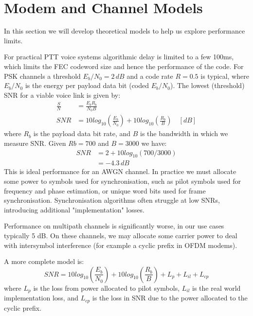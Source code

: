 \documentclass{article}
\begin{document}

\clearpage

\section{Modem and Channel Models}

In this section we will develop theoretical models to help us explore performance limits.

For practical PTT voice systems algorithmic delay is limited to a few 100ms, which limits the FEC codeword size and hence the performance of the code.  For PSK channels a threshold $E_b/N_0=2 \, \si{dB}$ and a code rate $R=0.5$ is typical, where $E_b/N_0$ is the energy per payload data bit (coded $E_b/N_0$).  The lowest (threshold) SNR for a viable voice link is given by:
\begin{equation}
\label{eq:snr}
\begin{split}
\frac{S}{N} &= \frac{E_bR_b}{N_0B} \\
SNR &= 10log_{10}\left(\frac{E_b}{N_0}\right) + 10log_{10}\left(\frac{R_b}{B}\right) \quad [\si{dB}]
\end{split}
\end{equation}
where $R_b$ is the payload data bit rate, and $B$ is the bandwidth in which we measure SNR.  Given $Rb=700$ and $B=3000$ we have:
\begin{equation}
\begin{split}
SNR &= 2 + 10log_{10}(700/3000) \\
    &= -4.3 \, \si{dB}
\end{split}
\end{equation}
This is ideal performance for an AWGN channel.  In practice we must allocate some power to symbols used for synchronisation, such as pilot symbols used for frequency and phase estimation, or unique word bits used for frame synchronisation.  Synchronisation algorithms often struggle at low SNRs, introducing additional "implementation" losses.

Performance on multipath channels is significantly worse, in our use cases typically 5 dB.  On these channels, we may allocate some carrier power to deal with intersymbol interference (for example a cyclic prefix in OFDM modems).

A more complete model is:
\begin{equation}
\label{eq:snr_all}
SNR = 10log_{10}\left(\frac{E_b}{N_0}\right) + 10log_{10}\left(\frac{R_b}{B}\right) + L_p + L_{il} + L_{cp}
\end{equation}
where $L_p$ is the loss from power allocated to pilot symbols, $L_{il}$ is the real world implementation loss, and $L_{cp}$ is the loss in SNR due to the power allocated to the cyclic prefix.
\end{document}
